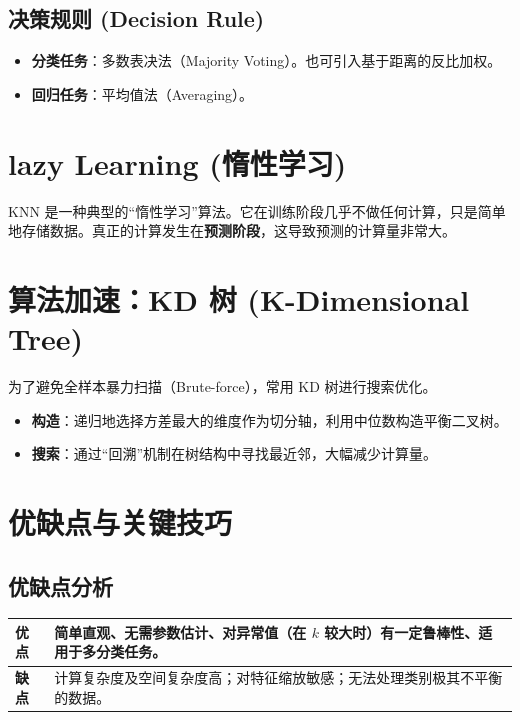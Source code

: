 \documentclass[12pt, a4paper]{article}
\begin{document}
\subsection{决策规则 (Decision Rule)}
\begin{itemize}
    \item \textbf{分类任务}：多数表决法（Majority Voting）。也可引入基于距离的反比加权。
    \item \textbf{回归任务}：平均值法（Averaging）。
\end{itemize}

\section{ lazy Learning (惰性学习)}
KNN 是一种典型的“惰性学习”算法。它在训练阶段几乎不做任何计算，只是简单地存储数据。真正的计算发生在\textbf{预测阶段}，这导致预测的计算量非常大。

\section{算法加速：KD 树 (K-Dimensional Tree)}
为了避免全样本暴力扫描（Brute-force），常用 KD 树进行搜索优化。
\begin{itemize}
    \item \textbf{构造}：递归地选择方差最大的维度作为切分轴，利用中位数构造平衡二叉树。
    \item \textbf{搜索}：通过“回溯”机制在树结构中寻找最近邻，大幅减少计算量。
\end{itemize}

\section{优缺点与关键技巧}

\subsection{优缺点分析}
\begin{table}[h]
\centering
\begin{tabularx}{\textwidth}{|l|X|}
\hline
\textbf{优点} & 简单直观、无需参数估计、对异常值（在 $k$ 较大时）有一定鲁棒性、适用于多分类任务。 \\
\hline
\textbf{缺点} & 计算复杂度及空间复杂度高；对特征缩放敏感；无法处理类别极其不平衡的数据。 \\
\hline
\end{tabularx}
\end{table}
\end{document}
